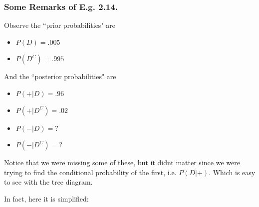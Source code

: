 \documentclass[12pt]{book}
\begin{document}
\subsubsection{Some Remarks of E.g. 2.14.}
Observe the ``prior probabilities" are
\begin{itemize}
\item $P(D)=.005$
\item $P(D^C)=.995$
\end{itemize}
And the ``posterior probabilities" are
\begin{itemize}
\item $P(+|D)=.96$
\item $P(+|D^C)=.02$
\item $P(-|D)=?$
\item $P(-|D^C)=?$
\end{itemize}
Notice that we were missing some of these, but it didnt matter since we were trying to find the conditional probability of the first, i.e. $P(D|+)$. Which is easy to see with the tree diagram. 
\begin{center}
\end{center}
In fact, here it is simplified:
\end{document}
